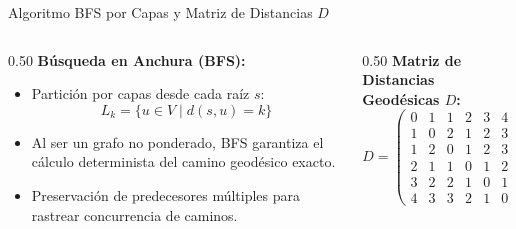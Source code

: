 \documentclass[aspectratio=169,10pt]{beamer}
\begin{document}
\begin{frame}{Algoritmo BFS por Capas y Matriz de Distancias $D$}
    \begin{columns}[T]
        \begin{column}{0.50\textwidth}
            \textbf{Búsqueda en Anchura (BFS):}
            \begin{itemize}
                \item Partición por capas desde cada raíz $s$:
                $$L_k = \{u \in V \mid d(s, u) = k\}$$
                \item Al ser un grafo no ponderado, BFS garantiza el cálculo determinista del camino geodésico exacto.
                \item Preservación de predecesores múltiples para rastrear concurrencia de caminos.
            \end{itemize}
        \end{column}
        \begin{column}{0.50\textwidth}
            \textbf{Matriz de Distancias Geodésicas $D$:}
            $$D = \begin{pmatrix}
            0 & 1 & 1 & 2 & 3 & 4 \\
            1 & 0 & 2 & 1 & 2 & 3 \\
            1 & 2 & 0 & 1 & 2 & 3 \\
            2 & 1 & 1 & 0 & 1 & 2 \\
            3 & 2 & 2 & 1 & 0 & 1 \\
            4 & 3 & 3 & 2 & 1 & 0
            \end{pmatrix}$$
        \end{column}
    \end{columns}
\end{frame}
\end{document}
